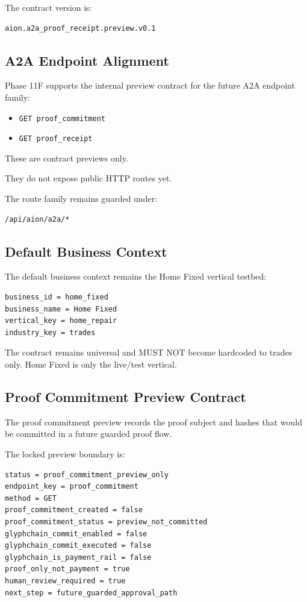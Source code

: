 The contract version is:

\begin{verbatim}
aion.a2a_proof_receipt.preview.v0.1
\end{verbatim}

\subsection{A2A Endpoint Alignment}

Phase 11F supports the internal preview contract for the future A2A endpoint family:

\begin{itemize}
  \item \texttt{GET proof\_commitment}
  \item \texttt{GET proof\_receipt}
\end{itemize}

These are contract previews only.

They do not expose public HTTP routes yet.

The route family remains guarded under:

\begin{verbatim}
/api/aion/a2a/*
\end{verbatim}

\subsection{Default Business Context}

The default business context remains the Home Fixed vertical testbed:

\begin{verbatim}
business_id = home_fixed
business_name = Home Fixed
vertical_key = home_repair
industry_key = trades
\end{verbatim}

The contract remains universal and MUST NOT become hardcoded to trades only. Home Fixed is only the live/test vertical.

\subsection{Proof Commitment Preview Contract}

The proof commitment preview records the proof subject and hashes that would be committed in a future guarded proof flow.

The locked preview boundary is:

\begin{verbatim}
status = proof_commitment_preview_only
endpoint_key = proof_commitment
method = GET
proof_commitment_created = false
proof_commitment_status = preview_not_committed
glyphchain_commit_enabled = false
glyphchain_commit_executed = false
glyphchain_is_payment_rail = false
proof_only_not_payment = true
human_review_required = true
next_step = future_guarded_approval_path
\end{verbatim}

